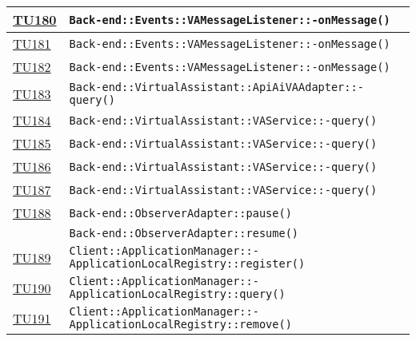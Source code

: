 \begin{longtable}{|>{\centering}m{1cm}|m{12cm}<{\centering}|}
\hyperlink{TU180}{TU180} & \texttt{Back-end::Events::VAMessageListener::-\linebreak onMessage()}\\ \hline

\hyperlink{TU181}{TU181} & \texttt{Back-end::Events::VAMessageListener::-\linebreak onMessage()}\\ \hline

\hyperlink{TU182}{TU182} & \texttt{Back-end::Events::VAMessageListener::-\linebreak onMessage()}\\ \hline

\hyperlink{TU183}{TU183} & \texttt{Back-end::VirtualAssistant::ApiAiVAAdapter::-\linebreak query()}\\ \hline

\hyperlink{TU184}{TU184} & \texttt{Back-end::VirtualAssistant::VAService::-\linebreak query()}\\ \hline

\hyperlink{TU185}{TU185} & \texttt{Back-end::VirtualAssistant::VAService::-\linebreak query()}\\ \hline

\hyperlink{TU186}{TU186} & \texttt{Back-end::VirtualAssistant::VAService::-\linebreak query()}\\ \hline

\hyperlink{TU187}{TU187} & \texttt{Back-end::VirtualAssistant::VAService::-\linebreak query()}\\ \hline

\hyperlink{TU188}{TU188} & \texttt{Back-end::ObserverAdapter::pause()}\\ & \texttt{Back-end::ObserverAdapter::resume()}\\ \hline

\hyperlink{TU189}{TU189} & \texttt{Client::ApplicationManager::-\linebreak ApplicationLocalRegistry::register()}\\ \hline

\hyperlink{TU190}{TU190} & \texttt{Client::ApplicationManager::-\linebreak ApplicationLocalRegistry::query()}\\ \hline

\hyperlink{TU191}{TU191} & \texttt{Client::ApplicationManager::-\linebreak ApplicationLocalRegistry::remove()}\\ \hline


\end{longtable}
